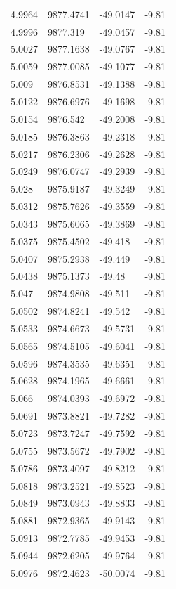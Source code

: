 \begin{table}[H]
\begin{tabular}{llll}
4.9964 & 9877.4741 & -49.0147 & -9.81 \\
4.9996 & 9877.319 & -49.0457 & -9.81 \\
5.0027 & 9877.1638 & -49.0767 & -9.81 \\
5.0059 & 9877.0085 & -49.1077 & -9.81 \\
5.009 & 9876.8531 & -49.1388 & -9.81 \\
5.0122 & 9876.6976 & -49.1698 & -9.81 \\
5.0154 & 9876.542 & -49.2008 & -9.81 \\
5.0185 & 9876.3863 & -49.2318 & -9.81 \\
5.0217 & 9876.2306 & -49.2628 & -9.81 \\
5.0249 & 9876.0747 & -49.2939 & -9.81 \\
5.028 & 9875.9187 & -49.3249 & -9.81 \\
5.0312 & 9875.7626 & -49.3559 & -9.81 \\
5.0343 & 9875.6065 & -49.3869 & -9.81 \\
5.0375 & 9875.4502 & -49.418 & -9.81 \\
5.0407 & 9875.2938 & -49.449 & -9.81 \\
5.0438 & 9875.1373 & -49.48 & -9.81 \\
5.047 & 9874.9808 & -49.511 & -9.81 \\
5.0502 & 9874.8241 & -49.542 & -9.81 \\
5.0533 & 9874.6673 & -49.5731 & -9.81 \\
5.0565 & 9874.5105 & -49.6041 & -9.81 \\
5.0596 & 9874.3535 & -49.6351 & -9.81 \\
5.0628 & 9874.1965 & -49.6661 & -9.81 \\
5.066 & 9874.0393 & -49.6972 & -9.81 \\
5.0691 & 9873.8821 & -49.7282 & -9.81 \\
5.0723 & 9873.7247 & -49.7592 & -9.81 \\
5.0755 & 9873.5672 & -49.7902 & -9.81 \\
5.0786 & 9873.4097 & -49.8212 & -9.81 \\
5.0818 & 9873.2521 & -49.8523 & -9.81 \\
5.0849 & 9873.0943 & -49.8833 & -9.81 \\
5.0881 & 9872.9365 & -49.9143 & -9.81 \\
5.0913 & 9872.7785 & -49.9453 & -9.81 \\
5.0944 & 9872.6205 & -49.9764 & -9.81 \\
5.0976 & 9872.4623 & -50.0074 & -9.81 \\

\end{tabular}
\end{table}
